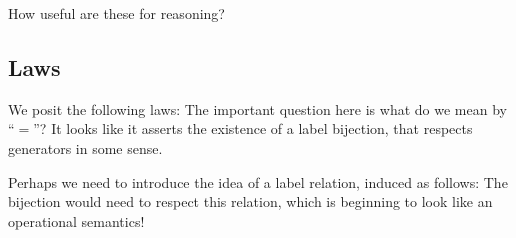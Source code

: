 How useful are these for reasoning?


\subsection{Laws}

We posit the following laws:
The important question here is what do we mean by ``$=$''?
It looks like it asserts the existence of a label bijection,
that respects generators in some sense.

Perhaps we need to introduce the idea of a label relation, induced
as follows:
The bijection would need to respect this relation,
which is beginning to look like an operational semantics!
